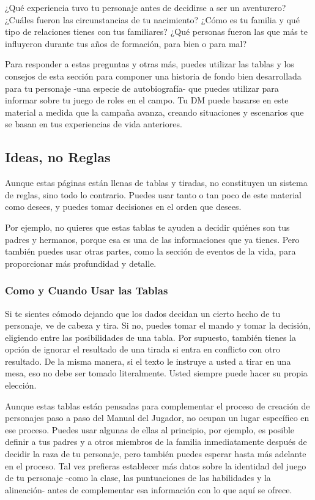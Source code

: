 \documentclass[a4paper,twocolumn,openany,10pt]{dndbook}
\begin{document}
¿Qué experiencia tuvo tu personaje antes de decidirse a ser un aventurero? ¿Cuáles fueron las circunstancias de tu nacimiento?
¿Cómo es tu familia y qué tipo de relaciones tienes con tus familiares? ¿Qué personas fueron las que más te influyeron durante
tus años de formación, para bien o para mal?

Para responder a estas preguntas y otras más, puedes utilizar las tablas y los consejos de esta sección para componer una
historia de fondo bien desarrollada para tu personaje -una especie de autobiografía- que puedes utilizar para informar sobre tu
juego de roles en el campo. Tu DM puede basarse en este material a medida que la campaña avanza, creando situaciones y
escenarios que se basan en tus experiencias de vida anteriores.

\subsection{Ideas, no Reglas}
Aunque estas páginas están llenas de tablas y tiradas, no constituyen un sistema de reglas, sino todo lo contrario. Puedes usar
tanto o tan poco de este material como desees, y puedes tomar decisiones en el orden que desees.

Por ejemplo, no quieres que estas tablas te ayuden a decidir quiénes son tus padres y hermanos, porque esa es una de las
informaciones que ya tienes. Pero también puedes usar otras partes, como la sección de eventos de la vida, para proporcionar
más profundidad y detalle. 

\subsubsection*{Como y Cuando Usar las Tablas}
Si te sientes cómodo dejando que los dados decidan un cierto hecho de tu personaje, ve de cabeza y tira. Si no, puedes tomar el
mando y tomar la decisión, eligiendo entre las posibilidades de una tabla. Por supuesto, también tienes la opción de ignorar el
resultado de una tirada si entra en conflicto con otro resultado. De la misma manera, si el texto le instruye a usted a tirar en
una mesa, eso no debe ser tomado literalmente. Usted siempre puede hacer su propia elección.

Aunque estas tablas están pensadas para complementar el proceso de creación de personajes paso a paso del Manual del Jugador, no
ocupan un lugar específico en ese proceso. Puedes usar algunas de ellas al principio, por ejemplo, es posible definir a tus
padres y a otros miembros de la familia inmediatamente después de decidir la raza de tu personaje, pero también puedes esperar
hasta más adelante en el proceso. Tal vez prefieras establecer más datos sobre la identidad del juego de tu personaje -como la
clase, las puntuaciones de las habilidades y la alineación- antes de complementar esa información con lo que aquí se ofrece.
\end{document}
